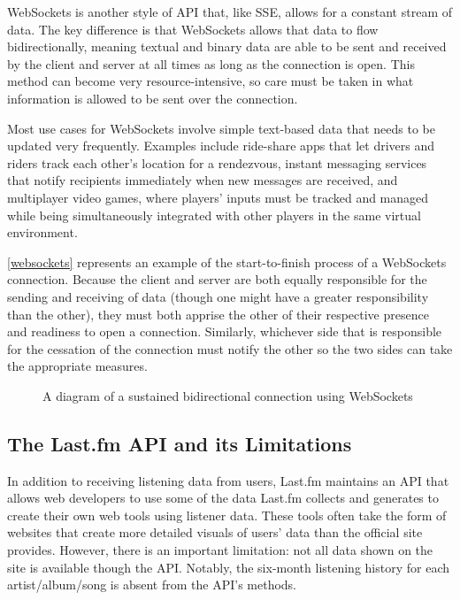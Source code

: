 WebSockets is another style of API that, like SSE, allows for a constant stream of data. The key difference is that WebSockets allows that data to flow bidirectionally, meaning textual and binary data are able to be sent and received by the client and server at all times as long as the connection is open. This method can become very resource-intensive, so care must be taken in what information is allowed to be sent over the connection.

Most use cases for WebSockets involve simple text-based data that needs to be updated very frequently. Examples include ride-share apps that let drivers and riders track each other's location for a rendezvous, instant messaging services that notify recipients immediately when new messages are received, and multiplayer video games, where players' inputs must be tracked and managed while being simultaneously integrated with other players in the same virtual environment.

\autoref{websockets} represents an example of the start-to-finish process of a WebSockets connection. Because the client and server are both equally responsible for the sending and receiving of data (though one might have a greater responsibility than the other), they must both apprise the other of their respective presence and readiness to open a connection. Similarly, whichever side that is responsible for the cessation of the connection must notify the other so the two sides can take the appropriate measures.

\begin{figure}[!ht]
	\begin{center}
		\caption{A diagram of a sustained bidirectional connection using WebSockets}\label{websockets}
	\end{center}
\end{figure}

\subsection{The Last.fm API and its Limitations}

In addition to receiving listening data from users, Last.fm maintains an API that allows web developers to use some of the data Last.fm collects and generates to create their own web tools using listener data. These tools often take the form of websites that create more detailed visuals of users' data than the official site provides. However, there is an important limitation: not all data shown on the site is available though the API. Notably, the six-month listening history for each artist/album/song is absent from the API's methods.

